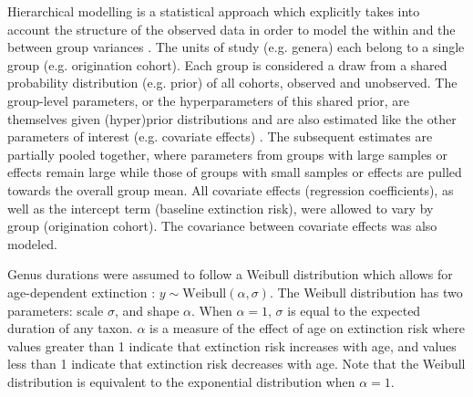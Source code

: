 \documentclass[11pt]{article}
\begin{document}
Hierarchical modelling is a statistical approach which explicitly takes into account the structure of the observed data in order to model the within and the between group variances \citep{Gelman2013d,Gelman2007}. The units of study (e.g. genera) each belong to a single group (e.g. origination cohort). Each group is considered a draw from a shared probability distribution (e.g. prior) of all cohorts, observed and unobserved. The group-level parameters, or the hyperparameters of this shared prior, are themselves given (hyper)prior distributions and are also estimated like the other parameters of interest (e.g. covariate effects) \citep{Gelman2013d}. The subsequent estimates are partially pooled together, where parameters from groups with large samples or effects remain large while those of groups with small samples or effects are pulled towards the overall group mean. All covariate effects (regression coefficients), as well as the intercept term (baseline extinction risk), were allowed to vary by group (origination cohort). The covariance between covariate effects was also modeled. 

Genus durations were assumed to follow a Weibull distribution which allows for age-dependent extinction \citep{Klein2003}: \(y \sim \mathrm{Weibull}(\alpha, \sigma)\). The Weibull distribution has two parameters: scale \(\sigma\), and shape \(\alpha\). When \(\alpha = 1\), \(\sigma\) is equal to the expected duration of any taxon. \(\alpha\) is a measure of the effect of age on extinction risk where values greater than 1 indicate that extinction risk increases with age, and values less than 1 indicate that extinction risk decreases with age. Note that the Weibull distribution is equivalent to the exponential distribution when \(\alpha = 1\). 
\end{document}
